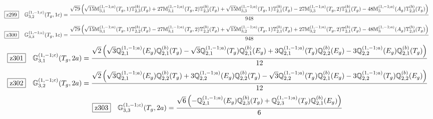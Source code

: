 \documentclass[fleqn,10pt,landscape]{jsarticle}
\begin{document}
\begin{dmath*}
\hspace*{3mm}\fbox{z299}\quad \mathbb{G}_{3,2}^{(1,-1;c)}(T_{g},1c)=\frac{\sqrt{79} \left(\sqrt{15} \mathbb{M}_{3,1}^{(1,-1;a)}(T_{g},1) \mathbb{T}_{2,3}^{(b)}(T_{g}) + 27 \mathbb{M}_{3,1}^{(1,-1;a)}(T_{g},2) \mathbb{T}_{2,3}^{(b)}(T_{g}) + \sqrt{15} \mathbb{M}_{3,3}^{(1,-1;a)}(T_{g},1) \mathbb{T}_{2,1}^{(b)}(T_{g}) - 27 \mathbb{M}_{3,3}^{(1,-1;a)}(T_{g},2) \mathbb{T}_{2,1}^{(b)}(T_{g}) - 48 \mathbb{M}_{3}^{(1,-1;a)}(A_{g}) \mathbb{T}_{2,2}^{(b)}(T_{g})\right)}{948}
\end{dmath*}
\begin{dmath*}
\hspace*{3mm}\fbox{z300}\quad \mathbb{G}_{3,3}^{(1,-1;c)}(T_{g},1c)=\frac{\sqrt{79} \left(\sqrt{15} \mathbb{M}_{3,1}^{(1,-1;a)}(T_{g},1) \mathbb{T}_{2,2}^{(b)}(T_{g}) - 27 \mathbb{M}_{3,1}^{(1,-1;a)}(T_{g},2) \mathbb{T}_{2,2}^{(b)}(T_{g}) + \sqrt{15} \mathbb{M}_{3,2}^{(1,-1;a)}(T_{g},1) \mathbb{T}_{2,1}^{(b)}(T_{g}) + 27 \mathbb{M}_{3,2}^{(1,-1;a)}(T_{g},2) \mathbb{T}_{2,1}^{(b)}(T_{g}) - 48 \mathbb{M}_{3}^{(1,-1;a)}(A_{g}) \mathbb{T}_{2,3}^{(b)}(T_{g})\right)}{948}
\end{dmath*}
\begin{dmath*}
\hspace*{3mm}\fbox{z301}\quad \mathbb{G}_{3,1}^{(1,-1;c)}(T_{g},2a)=\frac{\sqrt{2} \left(\sqrt{3} \mathbb{Q}_{2,1}^{(1,-1;a)}(E_{g}) \mathbb{Q}_{2,1}^{(b)}(T_{g}) - \sqrt{3} \mathbb{Q}_{2,1}^{(1,-1;a)}(T_{g}) \mathbb{Q}_{2,1}^{(b)}(E_{g}) + 3 \mathbb{Q}_{2,1}^{(1,-1;a)}(T_{g}) \mathbb{Q}_{2,2}^{(b)}(E_{g}) - 3 \mathbb{Q}_{2,2}^{(1,-1;a)}(E_{g}) \mathbb{Q}_{2,1}^{(b)}(T_{g})\right)}{12}
\end{dmath*}
\begin{dmath*}
\hspace*{3mm}\fbox{z302}\quad \mathbb{G}_{3,2}^{(1,-1;c)}(T_{g},2a)=\frac{\sqrt{2} \left(\sqrt{3} \mathbb{Q}_{2,1}^{(1,-1;a)}(E_{g}) \mathbb{Q}_{2,2}^{(b)}(T_{g}) + 3 \mathbb{Q}_{2,2}^{(1,-1;a)}(E_{g}) \mathbb{Q}_{2,2}^{(b)}(T_{g}) - \sqrt{3} \mathbb{Q}_{2,2}^{(1,-1;a)}(T_{g}) \mathbb{Q}_{2,1}^{(b)}(E_{g}) - 3 \mathbb{Q}_{2,2}^{(1,-1;a)}(T_{g}) \mathbb{Q}_{2,2}^{(b)}(E_{g})\right)}{12}
\end{dmath*}
\begin{dmath*}
\hspace*{3mm}\fbox{z303}\quad \mathbb{G}_{3,3}^{(1,-1;c)}(T_{g},2a)=\frac{\sqrt{6} \left(- \mathbb{Q}_{2,1}^{(1,-1;a)}(E_{g}) \mathbb{Q}_{2,3}^{(b)}(T_{g}) + \mathbb{Q}_{2,3}^{(1,-1;a)}(T_{g}) \mathbb{Q}_{2,1}^{(b)}(E_{g})\right)}{6}
\end{dmath*}
\end{document}
